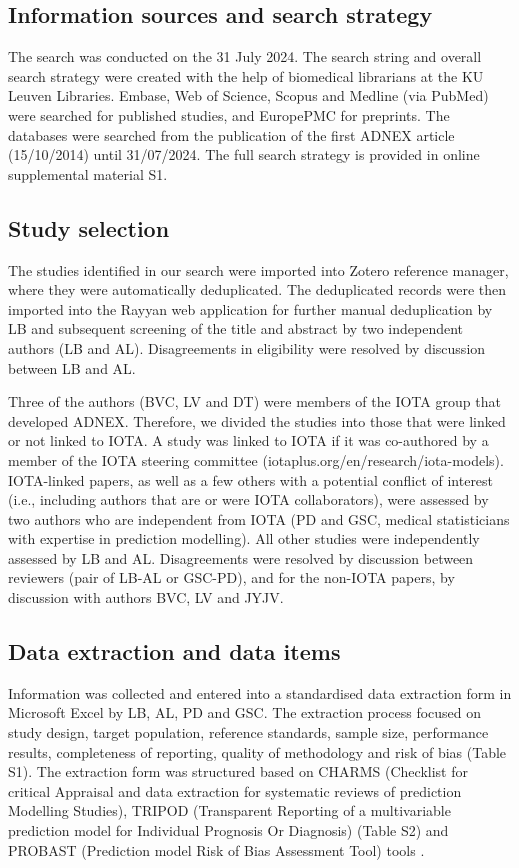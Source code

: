 \subsection{Information sources and search strategy}
The search was conducted on the 31 July 2024. The search string and overall search
strategy were created with the help of biomedical librarians at the KU Leuven
Libraries. Embase, Web of Science, Scopus and Medline (via PubMed) were searched for
published studies, and EuropePMC for preprints. The databases were searched from the
publication of the first \gls{ADNEX} article (15/10/2014) until 31/07/2024. The full
search strategy is provided in online supplemental material S1.

\subsection{Study selection}
The studies identified in our search were imported into Zotero reference manager,
where they were automatically deduplicated. The deduplicated records were then
imported into the Rayyan web application for further manual deduplication by LB and
subsequent screening of the title and abstract by two independent authors (LB and
AL). Disagreements in eligibility were resolved by discussion between LB and AL.

Three of the authors (BVC, LV and DT) were members of the \gls{IOTA} group that developed
\gls{ADNEX}. Therefore, we divided the studies into those that were linked or not linked to
\gls{IOTA}. A study was linked to \gls{IOTA} if it was co-authored by a member of the \gls{IOTA}
steering committee (iotaplus.org/en/research/iota-models). \gls{IOTA}-linked papers, as
well as a few others with a potential conflict of interest (i.e., including authors
that are or were \gls{IOTA} collaborators), were assessed by two authors who are
independent from \gls{IOTA} (PD and GSC, medical statisticians with expertise in prediction
modelling). All other studies were independently assessed by LB and AL. Disagreements
were resolved by discussion between reviewers (pair of LB-AL or GSC-PD), and for the
non-\gls{IOTA} papers, by discussion with authors BVC, LV and JYJV.

\subsection{Data extraction and data items}
Information was collected and entered into a standardised data extraction form in
Microsoft Excel by LB, AL, PD and GSC. The extraction process focused on study
design, target population, reference standards, sample size, performance results,
completeness of reporting, quality of methodology and risk of bias (Table S1). The extraction
form was structured based on \gls{CHARMS} (Checklist for critical Appraisal and data
extraction for systematic reviews of prediction Modelling Studies), \gls{TRIPOD}
(Transparent Reporting of a multivariable prediction model for Individual Prognosis
Or Diagnosis) (Table S2) and \gls{PROBAST} (Prediction model Risk of Bias Assessment Tool) tools
 \cite{moonsCriticalAppraisalData2014,collinsTransparentReportingMultivariable2015,moonsPROBASTToolAssess2019}.

